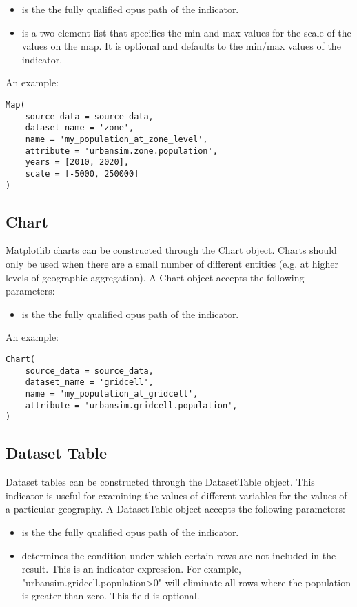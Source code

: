 \begin{itemize}
\tight
\item {} is the the fully qualified opus path of the indicator. 
\item {} is a two element list that specifies the min and max values 
for the scale of the values on the map. It is optional and defaults to the
min/max values of the indicator. 
\end{itemize}
  
An example:
\begin{verbatim}
Map( 
    source_data = source_data,
    dataset_name = 'zone',
    name = 'my_population_at_zone_level',
    attribute = 'urbansim.zone.population',
    years = [2010, 2020], 
    scale = [-5000, 250000]
)
\end{verbatim}

\subsection{Chart}

Matplotlib charts can be constructed through the Chart object. 
Charts should only be used when there are a small number of different 
entities (e.g. at higher levels of geographic aggregation).
A Chart object accepts the following parameters:

\begin{itemize}
\tight
\item {} is the the fully qualified opus path of the indicator. 
\end{itemize}

An example:
\begin{verbatim}
Chart(
    source_data = source_data,
    dataset_name = 'gridcell',
    name = 'my_population_at_gridcell',
    attribute = 'urbansim.gridcell.population',
)
\end{verbatim}

\subsection{Dataset Table}
Dataset tables can be constructed through the DatasetTable object. 
This indicator is useful for examining the values of different 
variables for the values of a particular geography. 
A DatasetTable object accepts the following parameters:

\begin{itemize}
\tight
\item {} is the the fully qualified opus path of the indicator.
\item {} determines the condition under which certain rows 
are not included in the result. This is an indicator expression.
For example, "urbansim.gridcell.population>0" will eliminate all rows 
where the population is greater than zero. This field is optional.
\end{itemize}

